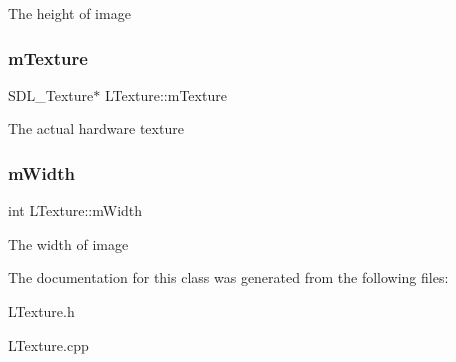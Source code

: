 The height of image \mbox{\label{class_l_texture_a98d76cf42f620b9c2eacd7b71c3c0c2f}} 
\subsubsection{\texorpdfstring{m\+Texture}{mTexture}}
{\footnotesize\ttfamily S\+D\+L\+\_\+\+Texture$\ast$ L\+Texture\+::m\+Texture\hspace{0.3cm}{\ttfamily [private]}}

The actual hardware texture \mbox{\label{class_l_texture_ac6b5edfd40c81b2b40b71b12e7da2b6f}} 
\subsubsection{\texorpdfstring{m\+Width}{mWidth}}
{\footnotesize\ttfamily int L\+Texture\+::m\+Width\hspace{0.3cm}{\ttfamily [private]}}

The width of image 

The documentation for this class was generated from the following files\+:\begin{DoxyCompactItemize}
\item 
L\+Texture.\+h\item 
L\+Texture.\+cpp\end{DoxyCompactItemize}
